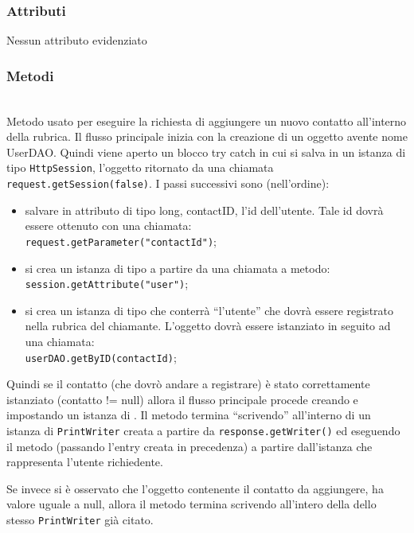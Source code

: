 \subsubsection*{Attributi}

Nessun attributo evidenziato

\subsubsection*{Metodi}
\begin{description}
	\item{}\\	
	Metodo usato per eseguire la richiesta di aggiungere un nuovo contatto all'interno della rubrica. Il flusso principale inizia  con la creazione di un oggetto  avente nome UserDAO. Quindi viene aperto un blocco try catch in cui si salva in un istanza di tipo \texttt{HttpSession}, l'oggetto ritornato da una chiamata \verb|request.getSession(false)|. I passi successivi sono (nell'ordine):
	\begin{itemize}
		\item salvare in attributo di tipo long, contactID, l'id dell'utente. Tale id dovrà essere ottenuto con una chiamata:\\
		\verb|request.getParameter("contactId")|;\\
		
		\item si crea un istanza di tipo  a partire da una chiamata a metodo:\\
		\verb|session.getAttribute("user")|;
		
		\item si crea un istanza di tipo  che conterrà ``l'utente'' che dovrà essere registrato nella rubrica del chiamante. L'oggetto dovrà essere istanziato in seguito ad una chiamata:\\
		\verb|userDAO.getByID(contactId)|;
	\end{itemize}
	Quindi se il contatto (che dovrò andare a registrare) è stato correttamente istanziato (contatto != null) allora il flusso principale procede creando e impostando un istanza di . Il metodo termina ``scrivendo''  all'interno di un istanza di \texttt{PrintWriter} creata a partire da \texttt{response.getWriter()} ed eseguendo il metodo  (passando l'entry creata in precedenza) a partire dall'istanza che rappresenta l'utente richiedente.
	
	Se invece si è osservato che l'oggetto contenente il contatto da aggiungere, ha valore uguale a null, allora il metodo termina scrivendo  all'intero della dello stesso \texttt{PrintWriter} già citato.
\end{description}

